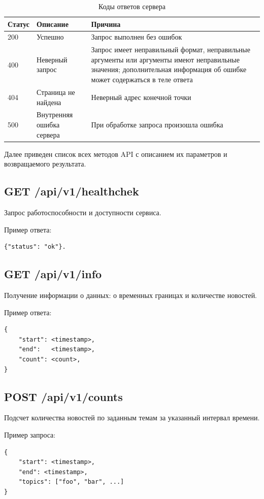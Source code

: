 \begin{table}[ht]
    \caption{Коды ответов сервера}
    \label{tab:status-codes}
    \begin{tabularx}{\textwidth}{|l|l|X|}
        \hline
        Статус & Описание & Причина \\
        \hline
        200 & Успешно & Запрос выполнен без ошибок \\
        \hline
        400 & Неверный запрос & Запрос имеет неправильный формат, неправильные аргументы или аргументы имеют неправильные значения; дополнительная информация об ошибке может содержаться в теле ответа \\
        \hline
        404 & Страница не найдена & Неверный адрес конечной точки \\
        \hline
        500 & Внутренняя ошибка сервера & При обработке запроса произошла ошибка \\
        \hline
    \end{tabularx}
\end{table}

Далее приведен список всех методов API с описанием их параметров и возвращаемого результата.


\subsection{GET /api/v1/healthchek}
Запрос работоспособности и доступности сервиса.

Пример ответа:
\begin{lstlisting}
{"status": "ok"}.
\end{lstlisting}

\subsection{GET /api/v1/info}
Получение информации о данных: о временных границах и количестве новостей.

Пример ответа:
\begin{lstlisting}
{
    "start": <timestamp>,
    "end":   <timestamp>,
    "count": <count>,
}
\end{lstlisting}

\subsection{POST /api/v1/counts}
Подсчет количества новостей по заданным темам за указанный интервал времени.

Пример запроса:
\begin{lstlisting}
{
    "start": <timestamp>,
    "end": <timestamp>,
    "topics": ["foo", "bar", ...]
}
\end{lstlisting}

